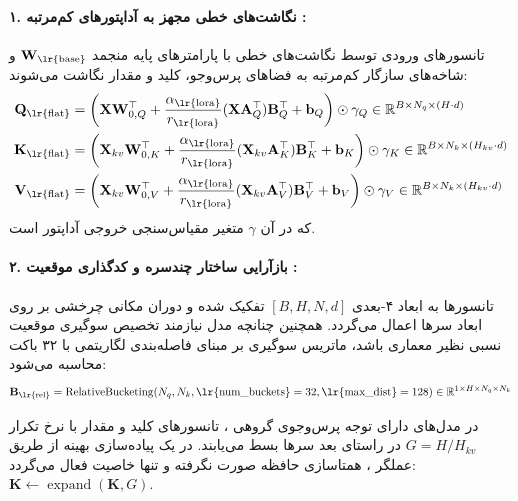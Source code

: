 \paragraph{۱. نگاشت‌های خطی مجهز به آداپتورهای کم‌مرتبه :}
تانسورهای ورودی توسط نگاشت‌های خطی با پارامترهای پایه منجمد $\mathbf{W}_{\text{\lr{base}}}$ و شاخه‌های سازگار کم‌مرتبه به فضاهای پرس‌وجو، کلید و مقدار نگاشت می‌شوند:
\begin{align}
\mathbf{Q}_{\text{\lr{flat}}} &= \left(\mathbf{X} \mathbf{W}_{0, Q}^\top + \frac{\alpha_{\text{\lr{lora}}}}{r_{\text{\lr{lora}}}} (\mathbf{X} \mathbf{A}_Q^\top) \mathbf{B}_Q^\top + \mathbf{b}_Q \right) \odot \gamma_Q \in \mathbb{R}^{B \times N_q \times (H \cdot d)} \\
\mathbf{K}_{\text{\lr{flat}}} &= \left(\mathbf{X}_{kv} \mathbf{W}_{0, K}^\top + \frac{\alpha_{\text{\lr{lora}}}}{r_{\text{\lr{lora}}}} (\mathbf{X}_{kv} \mathbf{A}_K^\top) \mathbf{B}_K^\top + \mathbf{b}_K \right) \odot \gamma_K \in \mathbb{R}^{B \times N_k \times (H_{kv} \cdot d)} \\
\mathbf{V}_{\text{\lr{flat}}} &= \left(\mathbf{X}_{kv} \mathbf{W}_{0, V}^\top + \frac{\alpha_{\text{\lr{lora}}}}{r_{\text{\lr{lora}}}} (\mathbf{X}_{kv} \mathbf{A}_V^\top) \mathbf{B}_V^\top + \mathbf{b}_V \right) \odot \gamma_V \in \mathbb{R}^{B \times N_k \times (H_{kv} \cdot d)}
\end{align}
که در آن $\gamma$ متغیر مقیاس‌سنجی خروجی آداپتور  است.

\paragraph{۲. بازآرایی ساختار چندسره و کدگذاری موقعیت :}
تانسورها به ابعاد ۴-بعدی $[B, H, N, d]$ تفکیک شده و دوران مکانی چرخشی  بر روی ابعاد سرها اعمال می‌گردد. همچنین چنانچه مدل نیازمند تخصیص سوگیری موقعیت نسبی  نظیر معماری  باشد، ماتریس سوگیری بر مبنای فاصله‌بندی لگاریتمی  با ۳۲ باکت محاسبه می‌شود:
\begin{equation}
\mathbf{B}_{\text{\lr{rel}}} = \operatorname{RelativeBucketing}(N_q, N_k, \text{\lr{num\_buckets}}=32, \text{\lr{max\_dist}}=128) \in \mathbb{R}^{1 \times H \times N_q \times N_k}
\end{equation}

در مدل‌های دارای توجه پرس‌وجوی گروهی ، تانسورهای کلید و مقدار با نرخ تکرار $G = H / H_{kv}$ در راستای بعد سرها بسط می‌یابند. در یک پیاده‌سازی بهینه از طریق عملگر ، همتاسازی حافظه صورت نگرفته و تنها خاصیت  فعال می‌گردد: $\mathbf{K} \leftarrow \operatorname{expand}(\mathbf{K}, G)$.

